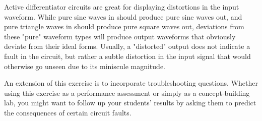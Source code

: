 Active differentiator circuits are great for displaying distortions in the input waveform.  While pure sine waves in should produce pure sine waves out, and pure triangle waves in should produce pure square waves out, deviations from these "pure" waveform types will produce output waveforms that obviously deviate from their ideal forms.  Usually, a "distorted" output does not indicate a fault in the circuit, but rather a subtle distortion in the input signal that would otherwise go unseen due to its miniscule magnitude.

An extension of this exercise is to incorporate troubleshooting questions.  Whether using this exercise as a performance assessment or simply as a concept-building lab, you might want to follow up your students' results by asking them to predict the consequences of certain circuit faults.




